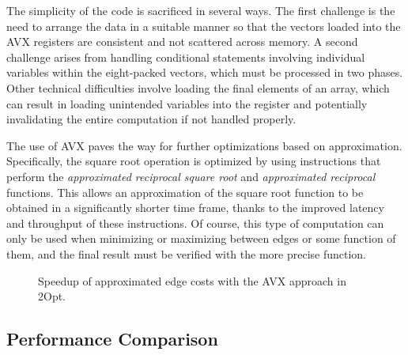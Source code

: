 The simplicity of the code is sacrificed in several ways.
The first challenge is the need to arrange the data in a suitable manner so that the vectors loaded into the AVX registers are consistent and not scattered across memory.
A second challenge arises from handling conditional statements involving individual variables within the eight-packed vectors, which must be processed in two phases.
Other technical difficulties involve loading the final elements of an array, which can result in loading unintended variables into the register and potentially invalidating the entire computation if not handled properly.

The use of AVX paves the way for further optimizations based on approximation.
Specifically, the square root operation is optimized by using instructions that perform the \textit{approximated reciprocal square root} and \textit{approximated reciprocal} functions.
This allows an approximation of the square root function to be obtained in a significantly shorter time frame, thanks to the improved latency and throughput of these instructions.
Of course, this type of computation can only be used when minimizing or maximizing between edges or some function of them, and the final result must be verified with the more precise function.

\begin{figure}[htbp]
    \centering
    \caption{Speedup of approximated edge costs with the AVX approach in 2Opt.} \label{fig:avxApprox}
\end{figure}

\subsection{Performance Comparison}

